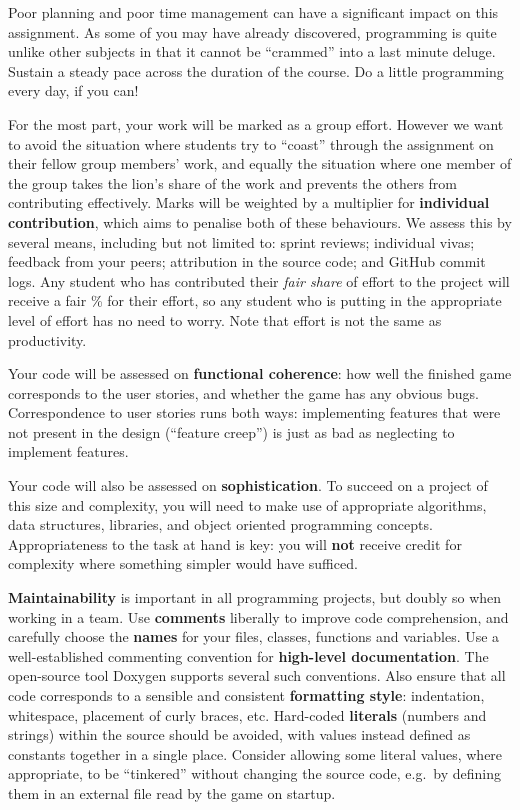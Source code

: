 \documentclass{../fal_assignment}
\begin{document}
Poor planning and poor time management can have a significant impact on this assignment. As some of you may have already discovered, programming is quite unlike other subjects in that it cannot be ``crammed'' into a last minute deluge. Sustain a steady pace across the duration of the course. Do a little programming every day, if you can!

For the most part, your work will be marked as a group effort.
However we want to avoid the situation where students try to ``coast'' through the assignment
on their fellow group members' work,
and equally the situation where one member of the group takes the lion's share of the work
and prevents the others from contributing effectively.
Marks will be weighted by a multiplier for \textbf{individual contribution},
which aims to penalise both of these behaviours.
We assess this by several means, including but not limited to: sprint reviews; individual vivas; feedback from your peers;
attribution in the source code; and GitHub commit logs.
Any student who has contributed their \textit{fair share} of effort to the project will receive a fair \% for their effort,
so any student who is putting in the appropriate level of effort has no need to worry.
Note that effort is not the same as productivity.

Your code will be assessed on \textbf{functional coherence}:
how well the finished game corresponds to the user stories,
and whether the game has any obvious bugs.
Correspondence to user stories runs both ways:
implementing features that were not present in the design (``feature creep'')
is just as bad as neglecting to implement features.

Your code will also be assessed on \textbf{sophistication}.
To succeed on a project of this size and complexity,
you will need to make use of appropriate algorithms, data structures, libraries, and object oriented programming concepts.
Appropriateness to the task at hand is key:
you will \textbf{not} receive credit for complexity  
where something simpler would have sufficed.

\textbf{Maintainability} is important in all programming projects,
but doubly so when working in a team.
Use \textbf{comments} liberally to improve code comprehension,
and carefully choose the \textbf{names} for your files, classes, functions and variables.
Use a well-established commenting convention
for \textbf{high-level documentation}.
The open-source tool Doxygen supports several such conventions.
Also ensure that all code corresponds to a sensible and consistent \textbf{formatting style}:
indentation, whitespace, placement of curly braces, etc.
Hard-coded \textbf{literals} (numbers and strings) within the source should be avoided,
with values instead defined as constants together in a single place.
Consider allowing some literal values, where appropriate, to be ``tinkered'' without changing the source code,
e.g.\ by defining them in an external file read by the game on startup.
\end{document}
